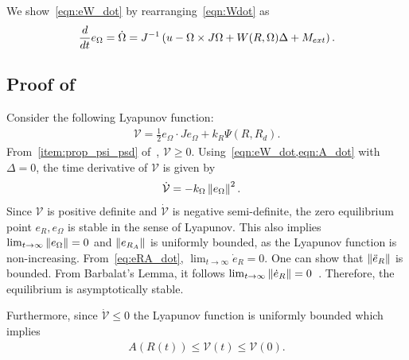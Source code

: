 We show~\cref{eqn:eW_dot} by rearranging~\cref{eqn:Wdot} as 
\begin{align*}
    \frac{d }{d t} e_\Omega = \dot{\Omega} = J^{-1} \left( u - \Omega \times J \Omega + W(R,\Omega) \Delta +M_{ext} \right).
\end{align*}

\subsection{Proof of~}\label{proof:att_control}
Consider the following Lyapunov function:
\begin{gather*}%
	\mathcal{V} = \frac{1}{2} e_\Omega \cdot J e_\Omega + k_R \Psi(R,R_d). 
\end{gather*}
From~\cref{item:prop_psi_psd} of~, \(\mathcal{V} \geq 0 \).
Using~\cref{eqn:eW_dot,eqn:A_dot} with \( \Delta = 0 \), the time derivative of \( \mathcal{V} \) is given by
\begin{align*}%
	\dot{\mathcal{V}} &= -k_\Omega \norm{e_\Omega}^2. 
\end{align*}
Since \( \mathcal{V} \) is positive definite and \( \dot{\mathcal{V}} \) is negative semi-definite, the zero equilibrium point \( e_R, e_\Omega \) is stable in the sense of Lyapunov. 
This also implies \( \lim_{t\to\infty} \left\| e_\Omega \right\| = 0 \) and \( \left\| e_{R_A} \right\| \) is uniformly bounded, as the Lyapunov function is non-increasing. From~\cref{eq:eRA_dot}, $\lim_{t\to\infty} \dot e_R =0$. 
One can show that \( \left\| \ddot{e}_R \right\| \) is bounded.
From Barbalat's Lemma, it follows \( \lim_{t\to\infty}\left\| \dot{e}_R \right\| = 0 \)~\cite[Lemma 8.2]{khalil1996}. 
Therefore, the equilibrium is asymptotically stable. 
	
Furthermore, since \( \dot{\mathcal{V}} \leq 0 \) the Lyapunov function is uniformly bounded which implies 
\begin{align*}
	A(R(t)) \leq \mathcal{V}(t) \leq \mathcal{V}(0).
\end{align*}

